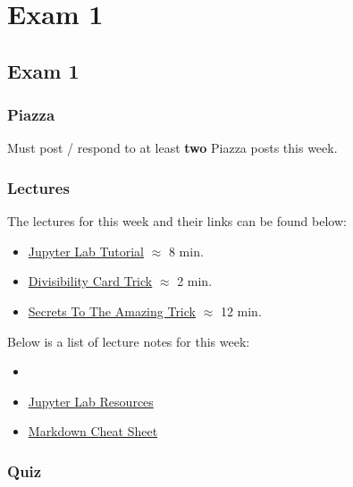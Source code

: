 \clearpage

\renewcommand{\ChapTitle}{Exam 1}
\renewcommand{\SectionTitle}{Exam 1}

\chapter{\ChapTitle}
\section{\SectionTitle}

\subsection{Piazza}

Must post / respond to at least \textbf{two} Piazza posts this week.  

\subsection{Lectures}

The lectures for this week and their links can be found below:

\begin{itemize}
    \item \href{https://applied.cs.colorado.edu/mod/hvp/view.php?id=51653}{Jupyter Lab Tutorial} $\approx$ 8 min.
    \item \href{https://www.youtube.com/watch?v=7zX7bZl4SLY}{Divisibility Card Trick} $\approx$ 2 min.
    \item \href{https://www.youtube.com/watch?v=5E3SIbS_uLU}{Secrets To The Amazing Trick} $\approx$ 12 min.
\end{itemize}

\noindent Below is a list of lecture notes for this week:

\begin{itemize}
    \item {}
    \item \href{https://www.colorado.edu/cs/students/computing-resources-students}{Jupyter Lab Resources}
    \item \href{https://github.com/adam-p/markdown-here/wiki/Markdown-Cheatsheet}{Markdown Cheat Sheet}
\end{itemize}

\subsection{Quiz}

